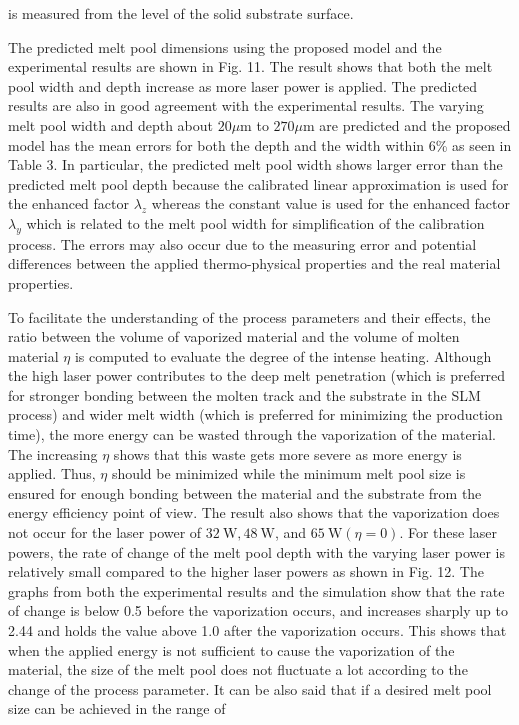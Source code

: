 \documentclass[10pt]{article}
\begin{document}
is measured from the level of the solid substrate surface.

The predicted melt pool dimensions using the proposed model and the experimental results are shown in Fig. 11. The result shows that both the melt pool width and depth increase as more laser power is applied. The predicted results are also in good agreement with the experimental results. The varying melt pool width and depth about $20 \mu \mathrm{m}$ to $270 \mu \mathrm{m}$ are predicted and the proposed model has the mean errors for both the depth and the width within 6\% as seen in Table 3. In particular, the predicted melt pool width shows larger error than the predicted melt pool depth because the calibrated linear approximation is used for the enhanced factor $\lambda_{z}$ whereas the constant value is used for the enhanced factor $\lambda_{y}$ which is related to the melt pool width for simplification of the calibration process. The errors may also occur due to the measuring error and potential differences between the applied thermo-physical properties and the real material properties.

To facilitate the understanding of the process parameters and their effects, the ratio between the volume of vaporized material and the volume of molten material $\eta$ is computed to evaluate the degree of the intense heating. Although the high laser power contributes to the deep melt penetration (which is preferred for stronger bonding between the molten track and the substrate in the SLM process) and wider melt width (which is preferred for minimizing the production time), the more energy can be wasted through the vaporization of the material. The increasing $\eta$ shows that this waste gets more severe as more energy is applied. Thus, $\eta$ should be minimized while the minimum melt pool size is ensured for enough bonding between the material and the substrate from the energy efficiency point of view. The result also shows that the vaporization does not occur for the laser power of $32 \mathrm{~W}, 48 \mathrm{~W}$, and $65 \mathrm{~W}(\eta=0)$. For these laser powers, the rate of change of the melt pool depth with the varying laser power is relatively small compared to the higher laser powers as shown in Fig. 12. The graphs from both the experimental results and the simulation show that the rate of change is below 0.5 before the vaporization occurs, and increases sharply up to 2.44 and holds the value above 1.0 after the vaporization occurs. This shows that when the applied energy is not sufficient to cause the vaporization of the material, the size of the melt pool does not fluctuate a lot according to the change of the process parameter. It can be also said that if a desired melt pool size can be achieved in the range of
\end{document}
